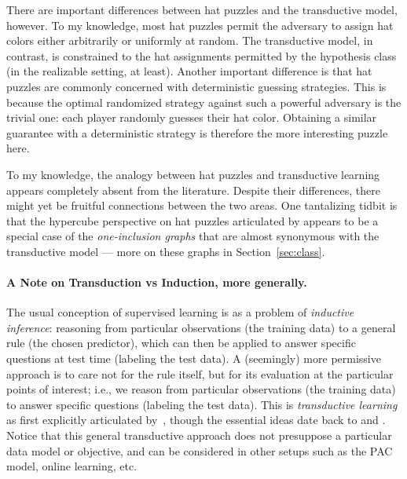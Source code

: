 There are important differences between hat puzzles and the transductive model, however. To my knowledge, most hat puzzles permit the adversary to assign hat colors either arbitrarily or uniformly at random. The transductive model, in contrast, is constrained to the hat assignments permitted by the hypothesis class (in the realizable setting, at least). Another important difference is that hat puzzles are commonly concerned with deterministic guessing strategies.  This is because the optimal randomized strategy against such a powerful adversary is the trivial one: each player randomly guesses their hat color. Obtaining a similar guarantee with a deterministic strategy is therefore the more interesting puzzle here. %

To my knowledge, the analogy between hat puzzles and transductive learning appears completely absent from the literature. Despite their differences, there might yet be fruitful connections between the two areas. One tantalizing tidbit is that the hypercube  perspective on hat puzzles articulated by \citet{butler_hat_2009} appears to be a special case of the \emph{one-inclusion graphs} that are almost synonymous with the transductive model --- more on these graphs in Section~\ref{sec:class}.



\paragraph{A Note on Transduction vs Induction, more generally.} The usual  conception of supervised learning is as a problem of \emph{inductive inference}: reasoning from particular observations (the training data) to a general rule (the chosen predictor), which can then be applied to answer specific questions at test time (labeling the test data). A (seemingly) more permissive approach is to care not for the rule itself, but for its evaluation at the particular points of interest; i.e.,  we reason from particular observations (the training data) to answer specific questions (labeling the test data). This is \emph{transductive learning} as first explicitly articulated by~\citet{vapnik_nature_1998}, though the essential ideas date back to \citet{vapnik_theory_1974} and \citet{vapnik_estimation_1982}. Notice that this general transductive approach does not presuppose a particular data model or objective, and can be considered in other setups such as the PAC model, online learning, etc.

